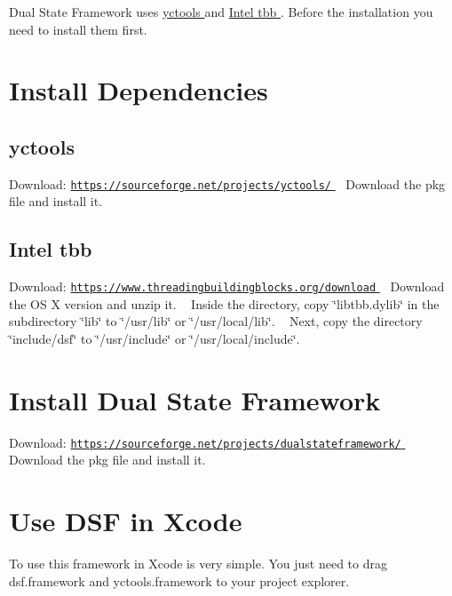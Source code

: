 Dual State Framework uses \hyperlink{}{yctools } and \hyperlink{}{Intel tbb }. Before the installation you need to install them first.\hypertarget{_mac_dependencies_mac}{}\section{Install Dependencies}\label{_mac_dependencies_mac}
\hypertarget{_mac_yctools_mac}{}\subsection{yctools}\label{_mac_yctools_mac}
Download\+: \hyperlink{}{\href{https://sourceforge.net/projects/yctools/}{\tt https\+://sourceforge.\+net/projects/yctools/} } ~\newline
 Download the pkg file and install it.\hypertarget{_mac_tbb_mac}{}\subsection{Intel tbb}\label{_mac_tbb_mac}
Download\+: \hyperlink{}{\href{https://www.threadingbuildingblocks.org/download}{\tt https\+://www.\+threadingbuildingblocks.\+org/download} } ~\newline
 Download the O\+S X version and unzip it. ~\newline
 Inside the directory, copy \char`\"{}libtbb.\+dylib\char`\"{} in the subdirectory \char`\"{}lib\char`\"{} to \char`\"{}/usr/lib\char`\"{} or \char`\"{}/usr/local/lib\char`\"{}. ~\newline
 Next, copy the directory \char`\"{}include/dsf\char`\"{} to \char`\"{}/usr/include\char`\"{} or \char`\"{}/usr/local/include\char`\"{}.\hypertarget{_mac_dsf_mac}{}\section{Install Dual State Framework}\label{_mac_dsf_mac}
Download\+: \hyperlink{}{\href{https://sourceforge.net/projects/dualstateframework/}{\tt https\+://sourceforge.\+net/projects/dualstateframework/} } ~\newline
 Download the pkg file and install it.\hypertarget{_mac_use_mac}{}\section{Use D\+S\+F in Xcode}\label{_mac_use_mac}
To use this framework in Xcode is very simple. You just need to drag dsf.\+framework and yctools.\+framework to your project explorer. 